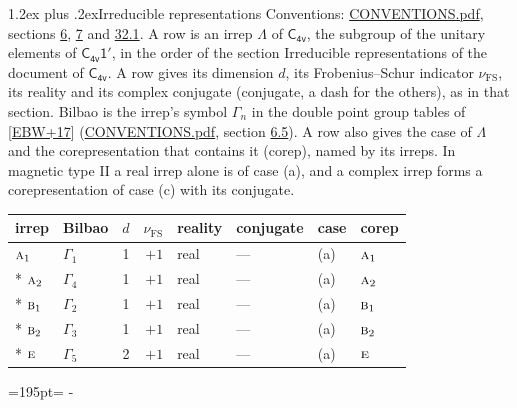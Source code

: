 \documentclass[10pt,a4paper]{article}
\makeatletter
\renewcommand\section{\@startsection{section}{1}{\z@}{-3ex plus -1ex minus -.2ex}%
  {1.2ex plus .2ex}{\normalfont\large\sffamily\bfseries\color{parttitle}}}
\newcommand{\needspace}[1]{\par\penalty-100\begingroup\dimen0=#1\relax\dimen2=\pagegoal
  \advance\dimen2-\pagetotal\ifdim\dimen0>\dimen2\relax\ifdim\dimen2>0pt\vfil\break\fi\fi
  \endgroup}
\numberwithin{equation}{section}
\newcommand{\grp}[1]{\mathsf{#1}}
\newcommand{\irr}[1]{\text{\normalfont\scshape #1}}
\newcommand{\fsind}{\nu_{\mathrm{FS}}}
\makeatother
\begin{document}
\section{Irreducible representations}\label{s:irreps}
Conventions: \href{../../CONVENTIONS.pdf}{CONVENTIONS.pdf}, sections \href{../../../rotation/CONVENTIONS.pdf\#conv.6}{6}, \href{../../../rotation/CONVENTIONS.pdf\#conv.7}{7} and \href{../../CONVENTIONS.pdf\#conv.32.1}{32.1}.
\leavevmode\label{n:irrep.Delta}A row is an irrep $\Lambda$ of $\grp{C_{4v}}$, the subgroup of the unitary elements of $\grp{C_{4v}1'}$, in the order of the section Irreducible representations of the document of \href{../../../rotation/data/pdf/C4v.pdf}{$\grp{C_{4v}}$}. \label{n:index.dimension}\label{n:index.frobenius}\label{n:head.irrep}\label{n:head.reality}\label{n:head.conjugate}A row gives its dimension $d$, its Frobenius--Schur indicator $\fsind$, its reality and its complex conjugate (conjugate, a dash for the others), as in that section. \label{n:head.bilbao}\label{n:irrep.alias.gamma}Bilbao is the irrep's symbol $\Gamma_n$ in the double point group tables of [\href{../../../REFERENCES.pdf\#ref.EBW+17}{EBW+17}] (\href{../../CONVENTIONS.pdf}{CONVENTIONS.pdf}, section \href{../../../rotation/CONVENTIONS.pdf\#conv.6.5}{6.5}). \label{n:head.case.corep}\label{n:head.corep}A row also gives the case of $\Lambda$ and the corepresentation that contains it (corep), named by its irreps. In magnetic type II a real irrep alone is of case (a), and a complex irrep forms a corepresentation of case (c) with its conjugate.
\setlength{\emergencystretch}{2em}\par\setlength{\emergencystretch}{0pt}
{\small\renewcommand{\arraystretch}{1.25}\setlength{\tabcolsep}{4pt}\begin{longtable}{@{}llrrllll@{}}\toprule
irrep & Bilbao & $d$ & $\fsind$ & reality & conjugate & case & corep\\\midrule\endhead
\bottomrule\endfoot\endlastfoot
$\irr{a}_{1}$ & $\Gamma_{1}$ & 1 & $+1$ & real & --- & (a) & $\irr{a}_{1}$\\*
$\irr{a}_{2}$ & $\Gamma_{4}$ & 1 & $+1$ & real & --- & (a) & $\irr{a}_{2}$\\*
$\irr{b}_{1}$ & $\Gamma_{2}$ & 1 & $+1$ & real & --- & (a) & $\irr{b}_{1}$\\*
$\irr{b}_{2}$ & $\Gamma_{3}$ & 1 & $+1$ & real & --- & (a) & $\irr{b}_{2}$\\*
$\irr{e}$ & $\Gamma_{5}$ & 2 & $+1$ & real & --- & (a) & $\irr{e}$\\
\bottomrule\end{longtable}}
\needspace{195pt}
\end{document}
